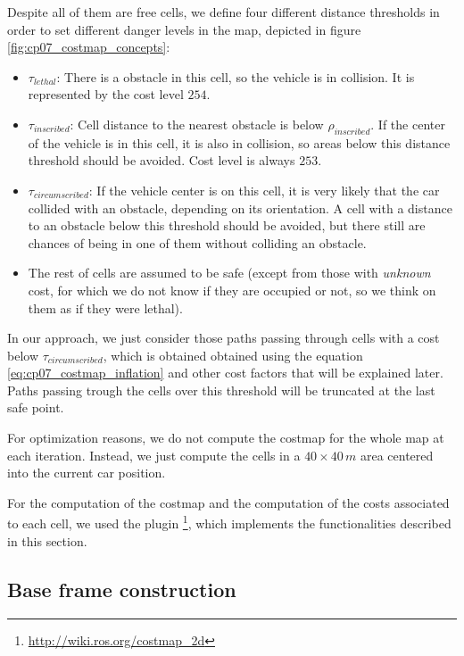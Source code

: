 Despite all of them are free cells, we define four different distance thresholds in order to set different danger levels in the map, depicted in figure \ref{fig:cp07_costmap_concepts}:

\begin{itemize}
 \item $\tau_{lethal}$: There is a obstacle in this cell, so the vehicle is in collision. It is represented by the cost level $254$.
 \item $\tau_{inscribed}$: Cell distance to the nearest obstacle is below $\rho_{inscribed}$. If the center of the vehicle is in this cell, it is also in collision, so areas below this distance threshold should be avoided. Cost level is always $253$.
 \item $\tau_{circumscribed}$: If the vehicle center is on this cell, it is very likely that the car collided with an obstacle, depending on its orientation. A cell with a distance to an obstacle below this threshold should be avoided, but there still are chances of being in one of them without colliding an obstacle. 
 \item The rest of cells are assumed to be safe (except from those with \emph{unknown} cost, for which we do not know if they are occupied or not, so we think on them as if they were lethal).
\end{itemize}

In our approach, we just consider those paths passing through cells with a cost below $\tau_{circumscribed}$, which is obtained obtained using the equation \ref{eq:cp07_costmap_inflation} and other cost factors that will be explained later. Paths passing trough the cells over this threshold will be truncated at the last safe point.

For optimization reasons, we do not compute the costmap for the whole map at each iteration. Instead, we just compute the cells in a $40 \times 40\,m$ area centered into the current car position. 

For the computation of the costmap and the computation of the costs associated to each cell, we used the \ROS plugin \footnote{\url{http://wiki.ros.org/costmap\_2d}}, which implements the functionalities described in this section.

\subsection{Base frame construction}\label{ch:chapter07_01_02}


